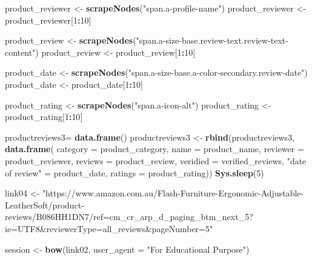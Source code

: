 \documentclass[
]{article}
\newenvironment{Shaded}{\begin{snugshade}}{\end{snugshade}}
\newcommand{\AttributeTok}[1]{\textcolor[rgb]{0.13,0.29,0.53}{#1}}
\newcommand{\DecValTok}[1]{\textcolor[rgb]{0.00,0.00,0.81}{#1}}
\newcommand{\FunctionTok}[1]{\textcolor[rgb]{0.13,0.29,0.53}{\textbf{#1}}}
\newcommand{\NormalTok}[1]{#1}
\newcommand{\OtherTok}[1]{\textcolor[rgb]{0.56,0.35,0.01}{#1}}
\newcommand{\SpecialCharTok}[1]{\textcolor[rgb]{0.81,0.36,0.00}{\textbf{#1}}}
\newcommand{\StringTok}[1]{\textcolor[rgb]{0.31,0.60,0.02}{#1}}
\begin{document}
\begin{Shaded}
\begin{Highlighting}[]
\NormalTok{  product\_reviewer }\OtherTok{\textless{}{-}} \FunctionTok{scrapeNodes}\NormalTok{(}\StringTok{"span.a{-}profile{-}name"}\NormalTok{)}
\NormalTok{  product\_reviewer }\OtherTok{\textless{}{-}}\NormalTok{ product\_reviewer[}\DecValTok{1}\SpecialCharTok{:}\DecValTok{10}\NormalTok{]}
  
\NormalTok{  product\_review }\OtherTok{\textless{}{-}} \FunctionTok{scrapeNodes}\NormalTok{(}\StringTok{"span.a{-}size{-}base.review{-}text.review{-}text{-}content"}\NormalTok{)}
\NormalTok{  product\_review }\OtherTok{\textless{}{-}}\NormalTok{ product\_review[}\DecValTok{1}\SpecialCharTok{:}\DecValTok{10}\NormalTok{]}
  
\NormalTok{  product\_date }\OtherTok{\textless{}{-}} \FunctionTok{scrapeNodes}\NormalTok{(}\StringTok{"span.a{-}size{-}base.a{-}color{-}secondary.review{-}date"}\NormalTok{)}
\NormalTok{  product\_date }\OtherTok{\textless{}{-}}\NormalTok{ product\_date[}\DecValTok{1}\SpecialCharTok{:}\DecValTok{10}\NormalTok{]}
  
\NormalTok{  product\_rating }\OtherTok{\textless{}{-}} \FunctionTok{scrapeNodes}\NormalTok{(}\StringTok{"span.a{-}icon{-}alt"}\NormalTok{)}
\NormalTok{  product\_rating }\OtherTok{\textless{}{-}}\NormalTok{ product\_rating[}\DecValTok{1}\SpecialCharTok{:}\DecValTok{10}\NormalTok{]}
  
\NormalTok{  productreviews3}\OtherTok{=} \FunctionTok{data.frame}\NormalTok{()}
\NormalTok{  productreviews3 }\OtherTok{\textless{}{-}} \FunctionTok{rbind}\NormalTok{(productreviews3, }\FunctionTok{data.frame}\NormalTok{(}
                      \AttributeTok{category =}\NormalTok{ product\_category,}
                      \AttributeTok{name =}\NormalTok{ product\_name,}
                      \AttributeTok{reviewer =}\NormalTok{ product\_reviewer,}
                      \AttributeTok{reviews =}\NormalTok{ product\_review,}
                      \AttributeTok{veridied =}\NormalTok{ verified\_reviews,}
                      \StringTok{"date of review"} \OtherTok{=}\NormalTok{ product\_date,}
                      \AttributeTok{ratings =}\NormalTok{ product\_rating))}
   \FunctionTok{Sys.sleep}\NormalTok{(}\DecValTok{5}\NormalTok{)}
  
\NormalTok{link04 }\OtherTok{\textless{}{-}} \StringTok{"https://www.amazon.com.au/Flash{-}Furniture{-}Ergonomic{-}Adjustable{-}LeatherSoft/product{-}reviews/B086HH1DN7/ref=cm\_cr\_arp\_d\_paging\_btm\_next\_5?ie=UTF8\&reviewerType=all\_reviews\&pageNumber=5"}


\NormalTok{  session }\OtherTok{\textless{}{-}} \FunctionTok{bow}\NormalTok{(link02,}
               \AttributeTok{user\_agent =} \StringTok{"For Educational Purpose"}\NormalTok{)}


\end{Highlighting}
\end{Shaded}
\end{document}
